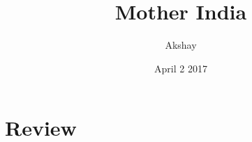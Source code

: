 \documentclass{article}
\title{Mother India}
\author{Akshay}
\date{April 2 2017}
\begin{document}
\maketitle
\section{Review}
\end{document}
